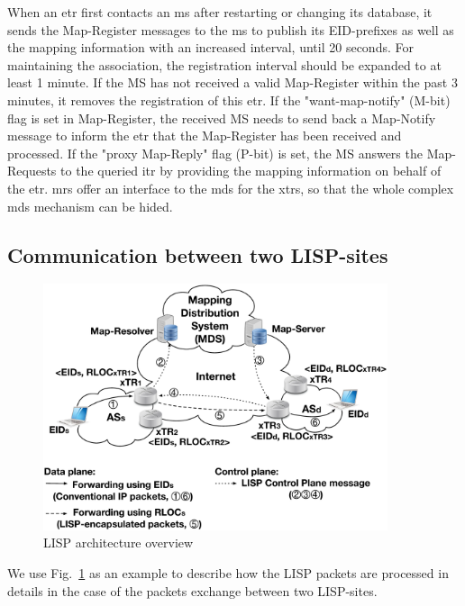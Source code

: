When an \acrshort{etr} first contacts an \acrshort{ms} after restarting or changing its database, it sends the Map-Register messages to the \acrshort{ms} to publish its EID-prefixes as well as the mapping information with an increased interval, until 20 seconds. 
For maintaining the association, the registration interval should be expanded to at least 1 minute. If the MS has not received a valid Map-Register within the past 3 minutes, it removes the registration of this \acrshort{etr}. If the "want-map-notify" (M-bit) flag is set in Map-Register, the received MS needs to send back a Map-Notify message to inform the \acrshort{etr} that the Map-Register has been received and processed. If the "proxy Map-Reply" flag (P-bit) is set, the MS answers the Map-Requests to the queried \acrshort{itr} by providing the mapping information on behalf of the \acrshort{etr}. \acrshort{mr}s offer an interface to the \acrshort{mds} for the \acrshort{xtr}s, so that the whole complex \acrshort{mds} mechanism can be hided.


\subsection{Communication between two LISP-sites}
\label{sec:communication_2_lisp}
\begin{figure}[!t]
	\centering
	\includegraphics[width=0.9\textwidth]{Pics/LISP_D_C_planes.eps}
	\caption{LISP architecture overview}
	\label{LISP_archi}
\end{figure}
We use Fig.~\ref{LISP_archi} as an example to describe how the LISP packets are processed in details in the case of the packets exchange between two LISP-sites.

